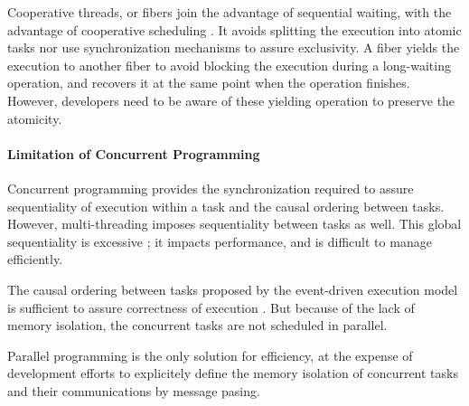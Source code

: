 Cooperative threads, or fibers join the advantage of sequential waiting, with the advantage of cooperative scheduling \cite{Adya2002,Behren2003a}.
It avoids splitting the execution into atomic tasks nor use synchronization mechanisms to assure exclusivity.
A fiber yields the execution to another fiber to avoid blocking the execution during a long-waiting operation, and recovers it at the same point when the operation finishes.
However, developers need to be aware of these yielding operation to preserve the atomicity.

\paragraph{Limitation of Concurrent Programming}




Concurrent programming provides the synchronization required to assure sequentiality of execution within a task and the causal ordering between tasks.
However, multi-threading imposes sequentiality between tasks as well.
This global sequentiality is excessive ; it impacts performance, and is difficult to manage efficiently.

The causal ordering between tasks proposed by the event-driven execution model is sufficient to assure correctness of execution \cite{Lamport1978,Reed2012}.
But because of the lack of memory isolation, the concurrent tasks are not scheduled in parallel.

Parallel programming is the only solution for efficiency, at the expense of development efforts to explicitely define the memory isolation of concurrent tasks and their communications by message pasing.


\paragraph{}

